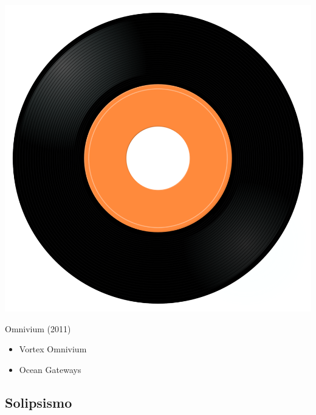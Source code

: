 \begin{minipage}[t]{0.25\textwidth}\vspace{0pt}
\captionsetup{type=figure}
\includegraphics[width=\textwidth]{Images/cover.png}
\caption*{Omnivium (2011)}
\end{minipage}
\begin{minipage}[t]{0.25\textwidth}\vspace{0pt}
\begin{itemize}[nosep,leftmargin=1em,labelwidth=*,align=left]
	\setlength{\itemsep}{0pt}
	\item Vortex Omnivium
	\item Ocean Gateways
\end{itemize}
\end{minipage}

\subsection{Solipsismo}

